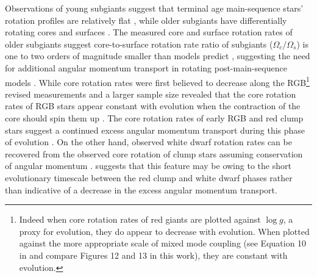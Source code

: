 Observations of young subgiants suggest that terminal age main-sequence stars' rotation profiles are relatively flat \citep{deheuvels_seismic_2020}, while older subgiants have differentially rotating cores and surfaces \citep{deheuvels_seismic_2014}.
The measured core and surface rotation rates of older subgiants suggest core-to-surface rotation rate ratio of subgiants ($\Omega_c / \Omega_s$) is one to two orders of magnitude smaller than models predict \citep{deheuvels_seismic_2014,spada_angular_2016, moyano_asteroseismology_2022}, suggesting the need for additional angular momentum transport in rotating post-main-sequence models \citep{fuller_asteroseismology_2015,spada_angular_2016,ouazzani_gamma_2018, eggenberger_asteroseismology_2019}.
While core rotation rates were first believed to decrease along the RGB\footnote{Indeed when core rotation rates of red giants are plotted against $\log{g}$, a proxy for evolution, they do appear to decrease with evolution. When plotted against the more appropriate scale of mixed mode coupling (see Equation 10 in \citet{gehan_core_2018} and compare Figures 12 and 13 in this work), they are constant with evolution.} \citep{mosser_spin_2012} revised measurements and a larger sample size revealed that the core rotation rates of RGB stars appear constant with evolution when the contraction of the core should spin them up \citep{mosser_spin_2012,gehan_core_2018,moyano_asteroseismology_2022}.
The core rotation rates of early RGB and red clump stars suggest a continued excess angular momentum transport during this phase of evolution \citep{cantiello_angular_2014,moyano_asteroseismology_2022}.
On the other hand, observed white dwarf rotation rates can be recovered from the observed core rotation of clump stars assuming conservation of angular momentum \citep{cantiello_angular_2014, den_hartogh_constraining_2019}.
\citet{cantiello_angular_2014} suggests that this feature may be owing to the short evolutionary timescale between the red clump and white dwarf phases rather than indicative of a decrease in the excess angular momentum transport.

